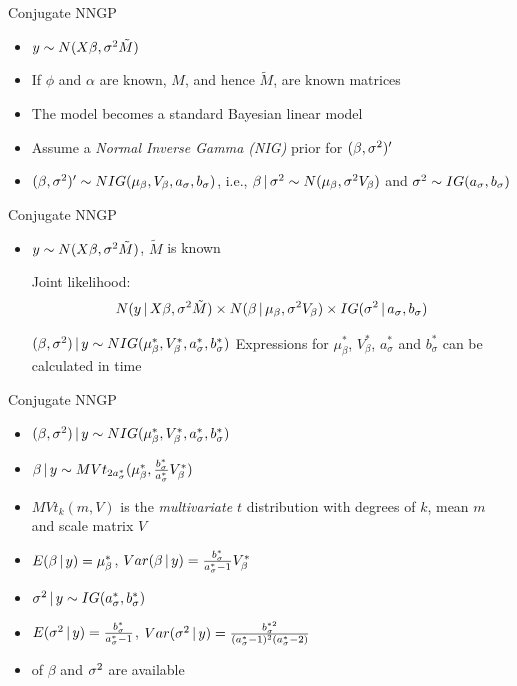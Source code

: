\begin{frame}{Conjugate NNGP}
\begin{itemize}
\item $y \sim N(X\beta, \sigma^2 \tilde M)$
\item If $\phi$ and $\alpha$ are known, $M$, and hence $\tilde M$, are known matrices
\item The model becomes a standard Bayesian linear model
\item Assume a \alert{\em Normal Inverse Gamma (NIG)} prior for $(\beta, \sigma^2)'$
\item $(\beta, \sigma^2)' \sim NIG(\mu_\beta, V_\beta, a_\sigma, b_\sigma)$, i.e., $\beta \,|\, \sigma^2 \sim N(\mu_\beta, \sigma^2 V_\beta)$ and $\sigma^2 \sim IG(a_\sigma, b_\sigma)$
\end{itemize}
\end{frame}

\begin{frame}{Conjugate NNGP}
\begin{itemize}
\item $y \sim N(X\beta, \sigma^2 \tilde M)$, $\tilde M$ is known
\vskip 5mm 
{
\begin{alertblock}{Joint likelihood:}
\[N(y \,|\, X\beta, \sigma^2 \tilde M) \times N(\beta \,|\, \mu_\beta, \sigma^2 V_\beta) \times IG(\sigma^2 \,|\, a_\sigma, b_\sigma) \]
\end{alertblock}}
\pause
\myitem {} $(\beta, \sigma^2) \,|\, y \sim NIG(\mu_\beta^*, V_\beta^*, a_\sigma^*, b_\sigma^*)$
\myitem Expressions for $\mu_\beta^*$, $V_\beta^*$, $a_\sigma^*$ and $b_\sigma^*$ can be calculated in  time
\end{itemize}
\end{frame}

\begin{frame}{Conjugate NNGP}
\begin{itemize}
\item $(\beta, \sigma^2) \,|\, y \sim NIG(\mu_\beta^*, V_\beta^*, a_\sigma^*, b_\sigma^*)$
\item {} $\beta \,|\, y \sim MVt_{2a_\sigma^*}(\mu_\beta^*, \frac {b_\sigma^*}{a_\sigma^*} V_\beta^*)$
\item $MVt_k(m,V)$ is the \alert{\em multivariate $t$} distribution with degrees of $k$, mean $m$ and scale matrix $V$
\item $E(\beta \,|\, y) = \mu_\beta^*$, $Var(\beta \,|\, y) = \frac{b_\sigma^*}{a_\sigma^*{-1}} V_\beta^*$
\item {} $\sigma^2 \,|\, y \sim IG(a_\sigma^*, b_\sigma^*)$
\item $E(\sigma^2 \,|\, y) = \frac{b_\sigma^*}{a_\sigma^*-1}$, $Var(\sigma^2 \,|\, y) = \frac{b_{\sigma}^{*2}}{(a_\sigma^*-1)^2(a_\sigma^*-2)}$
\item {} of $\beta$ and $\sigma^2$ are available
\end{itemize}
\end{frame}

